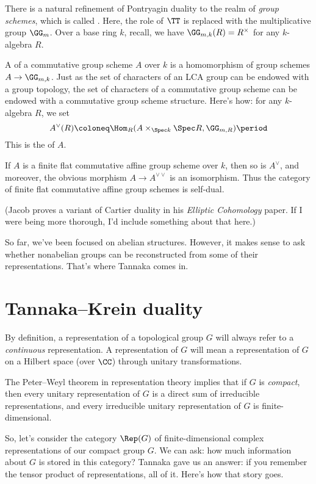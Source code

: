\documentclass[leqno]{article}
\begin{document}
There is a natural refinement of Pontryagin duality to the realm
of \emph{group schemes}, which is called .
Here, the role of \(\TT\) is replaced with
the multiplicative group \(\GG_m\).
Over a base ring \(k\), recall, we have
\(\GG_{m,k}(R) = R^{\times}\) for any \(k\)-algebra \(R\).

A 
of a commutative group scheme \(A\)
over \(k\)
is a homomorphism of group schemes \(A \to \GG_{m,k}\).
Just as the set of characters of an LCA group
can be endowed with a group topology,
the set of characters of a commutative group scheme
can be endowed with a commutative group scheme structure.
Here's how: for any \(k\)-algebra \(R\),
we set
\begin{equation*}
    A^{\vee}(R) \coloneq
    \Hom_R(A \times_{\Spec k} \Spec R, \GG_{m,R}) \period
\end{equation*}
This is the  of \(A\).

If \(A\) is a finite flat commutative affine group scheme over \(k\),
then so is \(A^{\vee}\), and moreover, the obvious morphism
\(A \to A^{\vee\vee}\) is an isomorphism.
Thus the category of finite flat commutative affine group schemes
is self-dual.

(Jacob proves a variant of Cartier duality in his
\emph{Elliptic Cohomology} paper.
If I were being more thorough,
I'd include something about that here.) 

So far, we've been focused on abelian structures.
However, it makes sense to ask whether nonabelian groups
can be reconstructed from some of their representations.
That's where Tannaka comes in.

\section{Tannaka--Krein duality}%
\label{tannakakrein}

By definition, a representation of a topological group \(G\) will
always refer to a \emph{continuous} representation.
A  representation of \(G\) will mean a representation
of \(G\) on a Hilbert space (over \(\CC\))
through unitary transformations.

The Peter--Weyl theorem in representation theory implies that
if \(G\) is \emph{compact}, then
every unitary representation of \(G\) is a direct sum
of irreducible representations,
and every irreducible unitary representation of \(G\) is
finite-dimensional.

So, let's consider the category \(\Rep(G)\) of
finite-dimensional complex representations
of our compact group \(G\).
We can ask:
how much information about \(G\) is stored in this category?
Tannaka gave us an answer:
if you remember the tensor product of representations, all of it.
Here's how that story goes.
\end{document}
